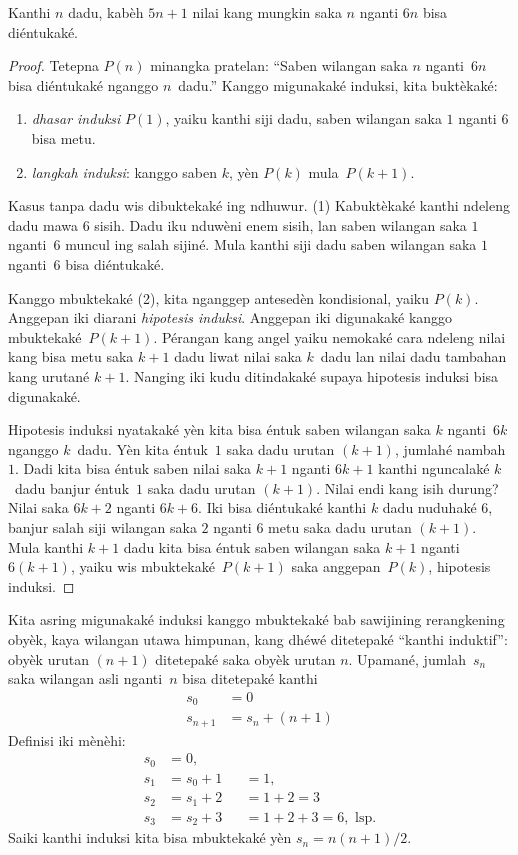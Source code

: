 \documentclass[../../../include/open-logic-section]{subfiles}
\begin{document}
\begin{thm}
  Kanthi $n$ dadu, kabèh $5n+1$ nilai
  kang mungkin saka $n$ nganti $6n$
  bisa diéntukaké.
\end{thm}

\begin{proof}
Tetepna $P(n)$ minangka pratelan:
``Saben wilangan saka $n$ nganti~$6n$
bisa diéntukaké nganggo $n$~dadu.''
Kanggo migunakaké induksi, kita buktèkaké:
\begin{enumerate}
\item \emph{dhasar induksi} $P(1)$,
  yaiku kanthi siji dadu, saben wilangan
  saka $1$ nganti $6$ bisa metu.
\item \emph{langkah induksi}: kanggo
  saben $k$, yèn $P(k)$ mula~$P(k+1)$.
\end{enumerate}

Kasus tanpa dadu wis dibuktekaké ing ndhuwur.
(1) Kabuktèkaké kanthi ndeleng dadu mawa
$6$ sisih. Dadu iku nduwèni enem sisih,
lan saben wilangan saka $1$ nganti~$6$
muncul ing salah sijiné. Mula kanthi siji
dadu saben wilangan saka $1$ nganti~$6$
bisa diéntukaké.

Kanggo mbuktekaké (2), kita nganggep
antesedèn kondisional, yaiku $P(k)$.
Anggepan iki diarani \emph{hipotesis induksi}.
Anggepan iki digunakaké kanggo mbuktekaké~$P(k+1)$.
Pérangan kang angel yaiku nemokaké cara
ndeleng nilai kang bisa metu saka $k+1$
dadu liwat nilai saka $k$~dadu lan nilai
dadu tambahan kang urutané $k+1$.
Nanging iki kudu ditindakaké supaya
hipotesis induksi bisa digunakaké.

Hipotesis induksi nyatakaké yèn kita
bisa éntuk saben wilangan saka $k$
nganti~$6k$ nganggo $k$~dadu.
Yèn kita éntuk~$1$ saka dadu urutan
$(k+1)$, jumlahé nambah $1$.
Dadi kita bisa éntuk saben nilai saka
$k+1$ nganti $6k+1$ kanthi nguncalaké
$k$~dadu banjur éntuk~$1$ saka
dadu urutan $(k+1)$. Nilai endi kang isih
durung? Nilai saka $6k+2$ nganti
$6k+6$. Iki bisa diéntukaké kanthi
$k$ dadu nuduhaké $6$, banjur
salah siji wilangan saka $2$ nganti
$6$ metu saka dadu urutan $(k+1)$.
Mula kanthi $k+1$ dadu kita
bisa éntuk saben wilangan saka $k+1$
nganti $6(k+1)$, yaiku
wis mbuktekaké~$P(k+1)$ saka
anggepan~$P(k)$, hipotesis induksi.
\end{proof}

Kita asring migunakaké induksi kanggo
mbuktekaké bab sawijining rerangkening
obyèk, kaya wilangan utawa himpunan,
kang dhéwé ditetepaké
``kanthi induktif'': obyèk urutan
$(n+1)$ ditetepaké saka obyèk
urutan $n$. Upamané, jumlah~$s_n$
saka wilangan asli nganti~$n$ bisa
ditetepaké kanthi
\begin{align*}
  s_0 & = 0\\
  s_{n+1} & = s_n + (n+1)
\end{align*}
Definisi iki mènèhi:
\begin{align*}
  s_0 & = 0,\\
  s_1 & = s_0 + 1 && = 1,\\
  s_2 & = s_1 + 2 && = 1 + 2 = 3\\
  s_3 & = s_2 + 3 && = 1 + 2 + 3 = 6, \text{ lsp.}
\end{align*}
Saiki kanthi induksi kita bisa
mbuktekaké yèn $s_n = n(n+1)/2$.
\end{document}
